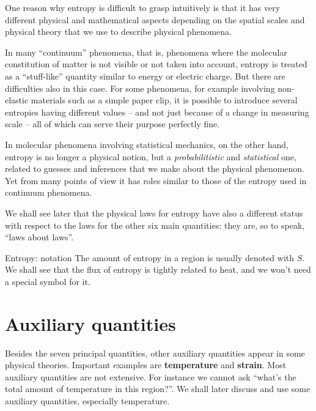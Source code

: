 \documentclass[a4paper,12pt,%
onecolumn,oneside,%
british%
]{memoir}
\renewcommand*{\|}[1][]{\nonscript\:#1\vert\nonscript\:\mathopen{}}
\newcommand*{\yS}{S}
\begin{document}
One reason why entropy is difficult to grasp intuitively is that it has very different physical and mathematical aspects depending on the spatial scales and physical theory that we use to describe physical phenomena.

In many \enquote{continuum} phenomena, that is, phenomena where the molecular constitution of matter is not visible or not taken into account, entropy is treated as a \enquote{stuff-like} quantity similar to energy or electric charge. But there are difficulties also in this case. For some phenomena, for example involving non-elastic materials such as a simple paper clip, it is possible to introduce several entropies having different values -- and not just because of a change in measuring scale -- all of which can serve their purpose perfectly fine.

In molecular phenomena involving statistical mechanics, on the other hand, entropy is no longer a physical notion, but a \emph{probabilitistic} and \emph{statistical} one, related to guesses and inferences that we make about the physical phenomenon. Yet from many points of view it has roles similar to those of the entropy used in continuum phenomena.

We shall see later that the physical laws for entropy have also a different status with respect to the laws for the other six main quantities: they are, so to speak, \enquote{laws about laws}.

\medskip

\begin{definition}{Entropy: notation}
  The amount of entropy in a region is usually denoted with $\yS$. We shall see that the flux of entropy is tightly related to heat, and we won't need a special symbol for it.
\end{definition}


\section{Auxiliary quantities}
\label{sec:aux_quantities}

Besides the seven principal quantities, other auxiliary quantities appear in some physical theories. Important examples are \textbf{temperature} and \textbf{strain}. Most auxiliary quantities are not extensive. For instance we cannot ask \enquote{what's the total amount of temperature in this region?}. We shall later discuss and use some auxiliary quantities, especially temperature.
\end{document}
